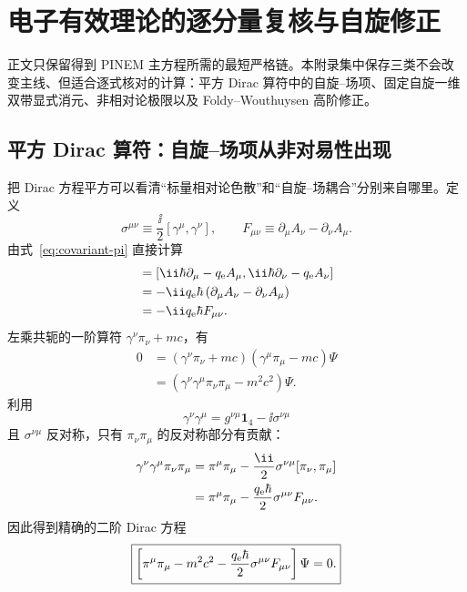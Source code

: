 \chapter{电子有效理论的逐分量复核与自旋修正}
\label{app:electron-checks}

正文只保留得到 PINEM 主方程所需的最短严格链。本附录集中保存三类不会改变主线、但适合逐式核对的计算：平方 Dirac 算符中的自旋--场项、固定自旋一维双带显式消元、非相对论极限以及 Foldy--Wouthuysen 高阶修正。

\section{平方 Dirac 算符：自旋--场项从非对易性出现}

把 Dirac 方程平方可以看清“标量相对论色散”和“自旋--场耦合”分别来自哪里。定义
\begin{equation}
 \sigma^{\mu\nu}\equiv\frac{\ii}{2}[\gamma^\mu,\gamma^\nu],
 \qquad
 F_{\mu\nu}\equiv\partial_\mu A_\nu-\partial_\nu A_\mu.
 \label{eq:sigma-F-def}
\end{equation}
由式~\eqref{eq:covariant-pi} 直接计算
\begin{align}
 [\pi_\mu,\pi_\nu]
 &=[\ii\hbar\partial_\mu-q_{\rm e}A_\mu,
 \ii\hbar\partial_\nu-q_{\rm e}A_\nu]\\
 &=-\ii q_{\rm e}\hbar
 \left(\partial_\mu A_\nu-\partial_\nu A_\mu\right)\\
 &=-\ii q_{\rm e}\hbar F_{\mu\nu}.
 \label{eq:pi-commutator}
\end{align}
左乘共轭的一阶算符 $\gamma^\nu\pi_\nu+mc$，有
\begin{align}
0
&=(\gamma^\nu\pi_\nu+mc)(\gamma^\mu\pi_\mu-mc)\Psi\\
&=\left(\gamma^\nu\gamma^\mu\pi_\nu\pi_\mu-m^2c^2\right)\Psi.
\end{align}
利用
\begin{equation}
 \gamma^\nu\gamma^\mu
 =g^{\nu\mu}\mathbf 1_4-\ii\sigma^{\nu\mu}
\end{equation}
且 $\sigma^{\nu\mu}$ 反对称，只有 $\pi_\nu\pi_\mu$ 的反对称部分有贡献：
\begin{align}
\gamma^\nu\gamma^\mu\pi_\nu\pi_\mu
&=\pi^\mu\pi_\mu
-\frac{\ii}{2}\sigma^{\nu\mu}[\pi_\nu,\pi_\mu]\\
&=\pi^\mu\pi_\mu
-\frac{q_{\rm e}\hbar}{2}\sigma^{\mu\nu}F_{\mu\nu}.
\end{align}
因此得到精确的二阶 Dirac 方程
\begin{equation}
 \boxed{
 \left[
 \pi^\mu\pi_\mu-m^2c^2
 -\frac{q_{\rm e}\hbar}{2}\sigma^{\mu\nu}F_{\mu\nu}
 \right]\Psi=0.}
 \label{eq:squared-dirac}
\end{equation}
